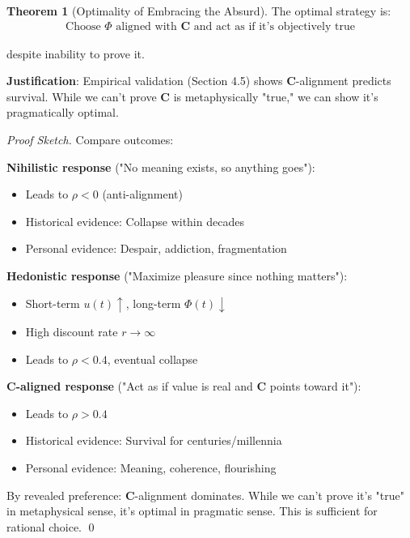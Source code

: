 \documentclass[11pt,a4paper]{article}
\theoremstyle{definition}
\newtheorem{theorem}{Theorem}[section]
\theoremstyle{remark}
\begin{document}
\begin{small}
\begin{enumerate}
\begin{theorem}[Optimality of Embracing the Absurd]
The optimal strategy is:
\begin{align}
\text{Choose } \Phi \text{ aligned with } \mathbf{C} \text{ and act as if it's objectively true}
\end{align}

despite inability to prove it.

\textbf{Justification}: Empirical validation (Section 4.5) shows \(\mathbf{C}\)-alignment predicts survival. While we can't prove \(\mathbf{C}\) is metaphysically "true," we can show it's pragmatically optimal.
\end{theorem}

\begin{proof}[Proof Sketch]
Compare outcomes:

\textbf{Nihilistic response} ("No meaning exists, so anything goes"):
\begin{itemize}
    \item Leads to \(\rho < 0\) (anti-alignment)
    \item Historical evidence: Collapse within decades
    \item Personal evidence: Despair, addiction, fragmentation
\end{itemize}

\textbf{Hedonistic response} ("Maximize pleasure since nothing matters"):
\begin{itemize}
    \item Short-term \(u(t) \uparrow\), long-term \(\Phi(t) \downarrow\)
    \item High discount rate \(r \to \infty\)
    \item Leads to \(\rho < 0.4\), eventual collapse
\end{itemize}

\textbf{C-aligned response} ("Act as if value is real and \(\mathbf{C}\) points toward it"):
\begin{itemize}
    \item Leads to \(\rho > 0.4\)
    \item Historical evidence: Survival for centuries/millennia
    \item Personal evidence: Meaning, coherence, flourishing
\end{itemize}

By revealed preference: \(\mathbf{C}\)-alignment dominates. While we can't prove it's "true" in metaphysical sense, it's optimal in pragmatic sense. This is sufficient for rational choice. \qed
\end{proof}


\end{enumerate}
\end{small}
\end{document}

